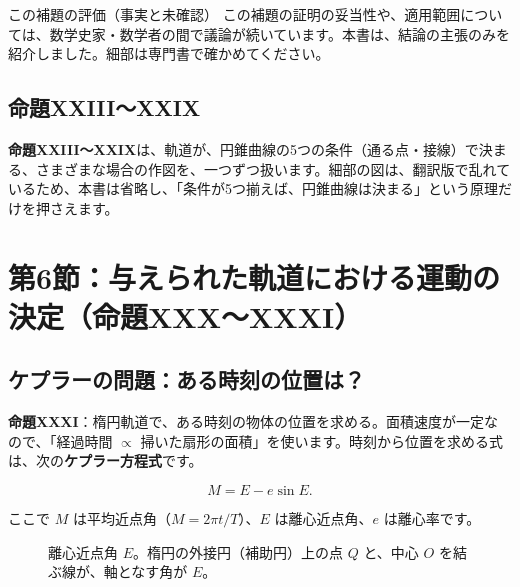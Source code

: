 \documentclass[a4paper,11pt,openany]{ltjsbook}
\begin{document}
\begin{notebox}{この補題の評価（事実と未確認）}
この補題の証明の妥当性や、適用範囲については、数学史家・数学者の間で議論が続いています。本書は、結論の主張のみを紹介しました。細部は専門書で確かめてください。
\end{notebox}

\subsection{命題XXIII〜XXIX}

\textbf{命題XXIII〜XXIX}は、軌道が、円錐曲線の5つの条件（通る点・接線）で決まる、さまざまな場合の作図を、一つずつ扱います。細部の図は、翻訳版で乱れているため、本書は省略し、「条件が5つ揃えば、円錐曲線は決まる」という原理だけを押さえます。

\section{第6節：与えられた軌道における運動の決定（命題XXX〜XXXI）}

\subsection{ケプラーの問題：ある時刻の位置は？}

\textbf{命題XXXI}：楕円軌道で、ある時刻の物体の位置を求める。面積速度が一定なので、「経過時間 $\propto$ 掃いた扇形の面積」を使います。時刻から位置を求める式は、次の\textbf{ケプラー方程式}です。

\[
M=E-e\sin E.
\]

ここで $M$ は平均近点角（$M=2\pi t/T$）、$E$ は離心近点角、$e$ は離心率です。

\begin{figure}[htbp]
\centering
{}
\caption{離心近点角 $E$。楕円の外接円（補助円）上の点 $Q$ と、中心 $O$ を結ぶ線が、軸となす角が $E$。}
\end{figure}
\end{document}
